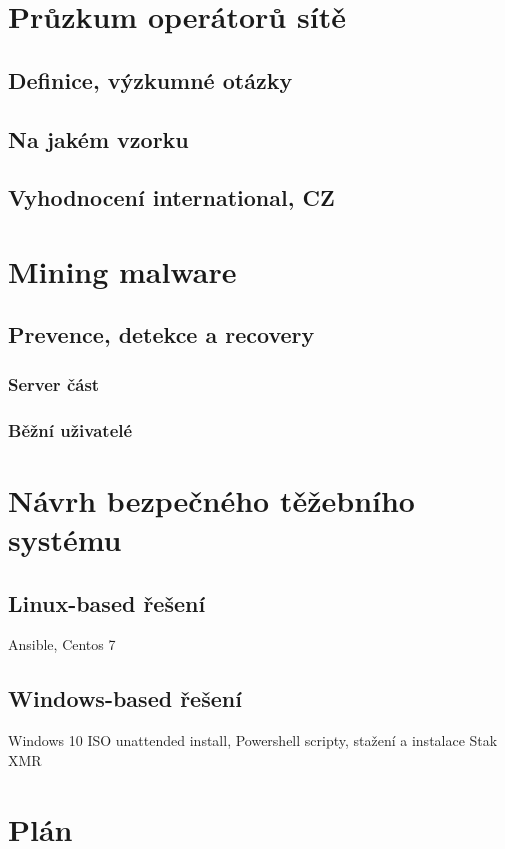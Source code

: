 \documentclass[
  printed, %
  table,   %
  nolof,     %
  nolot,     %
           oneside, color
]{fithesis3}
\begin{document}
\chapter{Průzkum operátorů sítě}
\section{Definice, výzkumné otázky}
\section{Na jakém vzorku}
\section{Vyhodnocení international, CZ}

 
\chapter{Mining malware}
\section{Prevence, detekce a recovery}
\subsection{Server část}
\subsection{Běžní uživatelé}


\chapter{Návrh bezpečného těžebního systému}
\section{Linux-based řešení}
Ansible, Centos 7
\section{Windows-based řešení}
Windows 10 ISO unattended install, Powershell scripty, stažení a instalace Stak XMR

\chapter{Plán}
\end{document}
